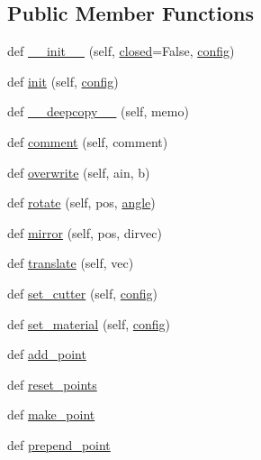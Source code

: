 \subsection*{Public Member Functions}
\begin{DoxyCompactItemize}
\item 
def \hyperlink{classpath_1_1_path_af9334fbbb2456c2fd075ddf20cc50d60}{\+\_\+\+\_\+init\+\_\+\+\_\+} (self, \hyperlink{classpath_1_1_path_a537add4e1eef9920422656b6a0759d47}{closed}=False, \hyperlink{classpath_1_1_path_a889e352f02dba833077975ce855276ed}{config})
\item 
def \hyperlink{classpath_1_1_path_a279457ad33d1f70a5312ed70de3a9c0e}{init} (self, \hyperlink{classpath_1_1_path_a889e352f02dba833077975ce855276ed}{config})
\item 
def \hyperlink{classpath_1_1_path_a015b42e4d8c8f9e664445493ec16d156}{\+\_\+\+\_\+deepcopy\+\_\+\+\_\+} (self, memo)
\item 
def \hyperlink{classpath_1_1_path_a2bb1f852efea2b482b1a5adaf8ad971e}{comment} (self, comment)
\item 
def \hyperlink{classpath_1_1_path_afd3f9ffc67fa33fc9d990a1d70651d02}{overwrite} (self, ain, b)
\item 
def \hyperlink{classpath_1_1_path_ac216692856eef8d1f1499c3413ffa2e1}{rotate} (self, pos, \hyperlink{classpath_1_1_path_a663e52d70abaa8958fdc38169a2e5eab}{angle})
\item 
def \hyperlink{classpath_1_1_path_aaafbd4effab0e762e4c85db926ba18d2}{mirror} (self, pos, dirvec)
\item 
def \hyperlink{classpath_1_1_path_a685528d275c53fc0e12656cc4144f8be}{translate} (self, vec)
\item 
def \hyperlink{classpath_1_1_path_ac7db720ae721fa0b90c89a8058f66fc2}{set\+\_\+cutter} (self, \hyperlink{classpath_1_1_path_a889e352f02dba833077975ce855276ed}{config})
\item 
def \hyperlink{classpath_1_1_path_a1a7addfede0136894c89f3fcff8ede33}{set\+\_\+material} (self, \hyperlink{classpath_1_1_path_a889e352f02dba833077975ce855276ed}{config})
\item 
def \hyperlink{classpath_1_1_path_a1a0bdea95906d71366482b8b4bc46ac9}{add\+\_\+point}
\item 
def \hyperlink{classpath_1_1_path_ae810d46d90ddb2958cdb4435a7b46986}{reset\+\_\+points}
\item 
def \hyperlink{classpath_1_1_path_aff0878c706c68a21e9eb885486719782}{make\+\_\+point}
\item 
def \hyperlink{classpath_1_1_path_a153ca161905a5d5390297a69490f6ddb}{prepend\+\_\+point}

\end{DoxyCompactItemize}

